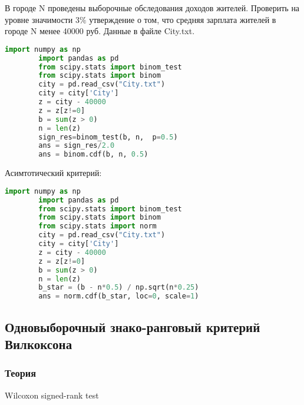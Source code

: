 \begin{problem}
	 В городе N проведены выборочные обследования доходов жителей. Проверить на уровне значимости 3$\%$ утверждение о том, что средняя зарплата жителей в городе N менее 40000 руб. Данные в файле City.txt.
\end{problem}
\begin{solution}
	\begin{lstlisting}[language=Python]
		import numpy as np
		import pandas as pd
		from scipy.stats import binom_test
		from scipy.stats import binom
		city = pd.read_csv("City.txt") 
		city = city['City']
		z = city - 40000
		z = z[z!=0]
		b = sum(z > 0)
		n = len(z)
		sign_res=binom_test(b, n,  p=0.5)
		ans = sign_res/2.0
		ans = binom.cdf(b, n, 0.5)
	\end{lstlisting}
	Асимтотический критерий:
	\begin{lstlisting}[language=Python]
		import numpy as np
		import pandas as pd
		from scipy.stats import binom_test
		from scipy.stats import binom
		from scipy.stats import norm
		city = pd.read_csv("City.txt") 
		city = city['City']
		z = city - 40000
		z = z[z!=0]
		b = sum(z > 0)
		n = len(z)
		b_star = (b - n*0.5) / np.sqrt(n*0.25)
		ans = norm.cdf(b_star, loc=0, scale=1)
	\end{lstlisting}
\end{solution}

\subsection{Одновыборочный знако-ранговый критерий Вилкоксона}\label{cha:1sample/sec:neparam/subsec:znak}

\subsubsection*{Теория}\label{cha:1sample/sec:neparam/subsec:znak/subsubsec:theory}

Wilcoxon signed-rank test\\


